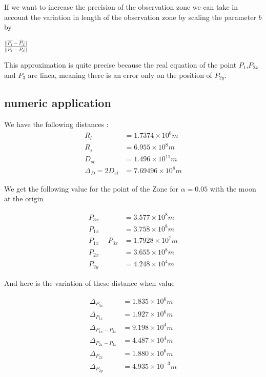 \documentclass[11pt]{article} %
\begin{document}
		
		
		If we want to increase the precision of the observation zone we can take in account the variation in length of the observation zone by scaling the parameter $b$ by
		
		
		$\frac{||\hat{P_1}-\hat{P_3}||}{||P_1-P_3||}$
		
		This approximation is quite precise because the real equation of the point $P_1$,$P_{2x}$ and $P_3$ are linea, meaning there is an error only on the position of $P_{2y}$.
		
		\subsection{numeric application}
		We have the following distances : 
		$$
		\begin{align}
			R_l&=1.7374\times10^6 m \\
			R_s&=6.955\times10^8 m \\ 
			D_{sl}&=1.496\times10^{11} m \\
			\Delta_D=2D_{el}&= 7.69496\times10^8 m
		\end{align}
		$$
		
		We get the following value for the point of the Zone for $\alpha=0.05$ with the moon at the origin
		
		$$
		\begin{align}
			P_{3x}&=3.577\times10^8 m \\
			P_{1x}&=3.758\times10^8 m \\ 
			P_{1x}-P_{3x}&=1.7928\times10^7 m \\ 
			P_{2x}&=3.655\times10^8 m \\
			P_{2y}&= 4.248\times10^4 m
		\end{align}
		$$
		
		And here is the variation of these distance when value 
		
		$$
		\begin{align}
			\Delta_{P_{3x}}&=1.835\times10^6 m \\
			\Delta_{P_{1x}}&=1.927\times10^6 m \\ 
			\Delta_{P_{1x}-P_{3x}}&=9.198\times10^4 m \\ 
			\Delta_{P_{2x}-P_{3x}}&=4.487\times10^4 m \\ 
			\Delta_{P_{2x}}&=1.880\times10^6 m \\
			\Delta_{P_{2y}}&= 4.935\times10^{-3} m
		\end{align}
		$$
		
\end{document}
